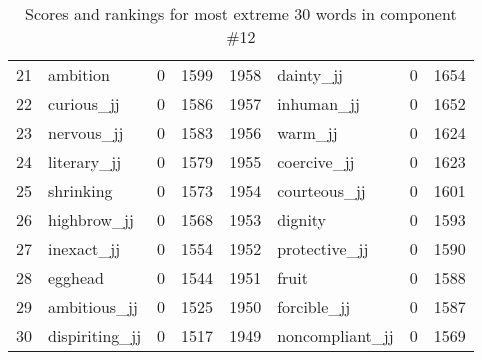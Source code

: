 \begin{table}[tbp]
\begin{tabular}{| rlr@{.}l | rlr@{.}l |}
    21 & ambition & 0 & 1599    &    1958 & dainty\_jj & 0 & 1654 \\
    22 & curious\_jj & 0 & 1586    &    1957 & inhuman\_jj & 0 & 1652 \\
    23 & nervous\_jj & 0 & 1583    &    1956 & warm\_jj & 0 & 1624 \\
    24 & literary\_jj & 0 & 1579    &    1955 & coercive\_jj & 0 & 1623 \\
    25 & shrinking & 0 & 1573    &    1954 & courteous\_jj & 0 & 1601 \\
    26 & highbrow\_jj & 0 & 1568    &    1953 & dignity & 0 & 1593 \\
    27 & inexact\_jj & 0 & 1554    &    1952 & protective\_jj & 0 & 1590 \\
    28 & egghead & 0 & 1544    &    1951 & fruit & 0 & 1588 \\
    29 & ambitious\_jj & 0 & 1525    &    1950 & forcible\_jj & 0 & 1587 \\
    30 & dispiriting\_jj & 0 & 1517    &    1949 & noncompliant\_jj & 0 & 1569 \\
    \hline
    \end{tabular}
    \caption{Scores and rankings for most extreme 30 words in component \#12} 
\end{table}
\clearpage
